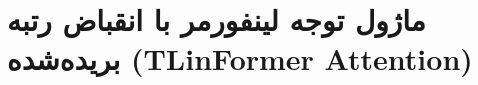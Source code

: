 \section{ماژول توجه لینفورمر با انقباض رتبه بریده‌شده (TLinFormer Attention)}
\label{sec:module_tlinformer_attention}
